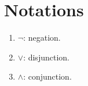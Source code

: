 \documentclass[a4paper,12pt]{article}
\begin{document}
\section*{Notations}

\begin{enumerate}
    \renewcommand{\labelenumi}{\(\diamond\)}
    \item
          \( \neg \)\;:\;
          negation.

    \item
          \( \vee \)\;:\;
          disjunction.

    \item
          \( \wedge \)\;:\;
          conjunction.
\end{enumerate}
\end{document}
